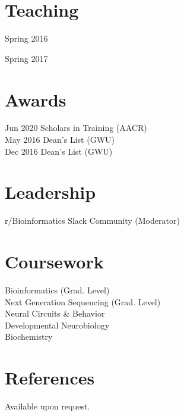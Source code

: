 
\newpage %

\begin{minipage}[t]{0.32\textwidth} %
\sectionspace
\section{Teaching}
\vspace{\topsep} %
\begin{tightitemize}
\item Spring 2016
\item Spring 2017
\end{tightitemize}

\section{Awards} 
Jun 2020 Scholars in Training (AACR)\\
May 2016 Dean's List (GWU) \\
Dec 2016 Dean's List (GWU) \\



\section{Leadership}
r/Bioinformatics Slack Community (Moderator) \\



\section{Coursework}
Bioinformatics (Grad. Level) \\
Next Generation Sequencing (Grad. Level) \\
Neural Circuits \& Behavior \\
Developmental Neurobiology \\
Biochemistry \\


\section{References}
Available upon request.

\end{minipage} %
